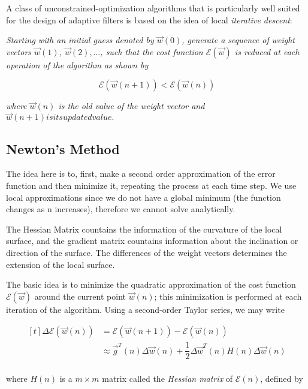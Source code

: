 \documentclass[twocolumn]{article}
\begin{document}
A class of unconstrained-optimization algorithms that is particularly well suited for the design of adaptive filters is based on the idea of local \textit{iterative descent}:

\textit{Starting with an initial guess denoted by $ \vec{w} (0) $, generate a sequence of weight vectors $ \vec{w} (1) $, $ \vec{w} (2), \ldots $, such that the cost function $ \mathcal{E} ( \vec{w}) $ is reduced at each operation of the algorithm as shown by}

$$ \mathcal{E} ( \vec{w} (n + 1)) < \mathcal{E} ( \vec{w} (n)) $$

\noindent \textit{where $ \vec{w} (n) $ is the old value of the weight vector and $ \vec{w} (n + 1) is its updated value.$}



\subsection{Newton's Method}

The idea here is to, first, make a second order approximation of the error function and then minimize it, repeating the process at each time step. We use local approximations since we do not have a global minimum (the function changes as n increases), therefore we cannot solve analytically.

The Hessian Matrix countains the information of the curvature of the local surface, and the gradient matrix countains information about the inclination or direction of the surface. The differences of the weight vectors determines the extension of the local surface. 

The basic idea is to minimize the quadratic approximation of the cost function $ \mathcal{E} ( \vec{w}) $ around the current point $ \vec{w} (n) $; this minimization is performed at each iteration of the algorithm. Using a second-order Taylor series, we may write

$$ \begin{aligned}[t]
	\Delta \mathcal{E} ( \vec{w} (n)) &= \mathcal{E} ( \vec{w} (n + 1)) - \mathcal{E} ( \vec{w} (n)) \\
					  &\approx \vec{g}^{T} (n) \Delta \vec{w} (n) + \dfrac{1}{2} \Delta \vec{w}^{T} (n) H (n) \Delta \vec{w} (n)\\
\end{aligned} $$

\noindent where $ H (n)$ is a $ m \times m $ matrix called the \textit{Hessian matrix} of $ \mathcal{E} (n) $, defined by
\end{document}
